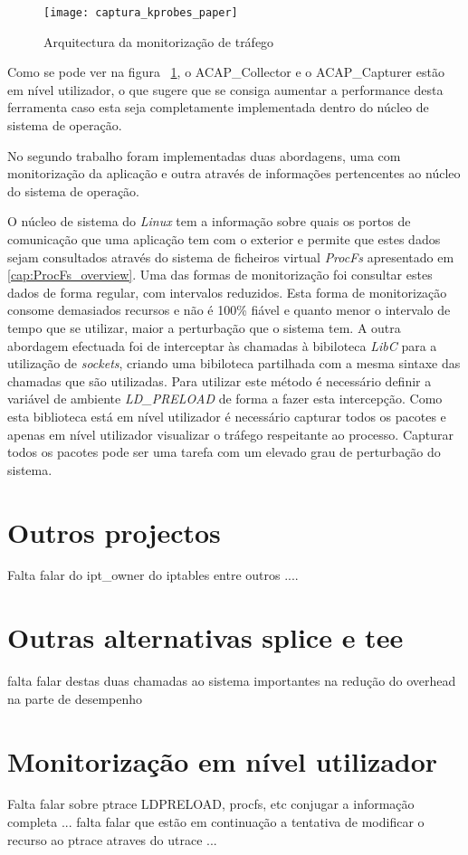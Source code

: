\begin{figure}[h!]
       \centering
       \texttt{[image: captura\_kprobes\_paper]}
       \caption{Arquitectura da monitorização de tráfego}
	\label{fig:paper_capture_kprobes}
\end{figure}


Como se pode ver na figura ~\ref{fig:paper_capture_kprobes}, o ACAP\_Collector e o ACAP\_Capturer estão em nível utilizador, o que sugere que se consiga aumentar a performance desta ferramenta caso esta seja completamente implementada dentro do núcleo de sistema de operação.

No segundo trabalho foram implementadas duas abordagens, uma com monitorização da aplicação e outra através de informações pertencentes ao núcleo do sistema de operação.

O núcleo de sistema do \textit{Linux} tem a informação sobre quais os portos de comunicação que uma aplicação tem com o exterior e permite que estes dados sejam consultados através do sistema de ficheiros virtual \textit{ProcFs} apresentado em \ref{cap:ProcFs_overview}. Uma das formas de monitorização foi consultar estes dados de forma regular, com intervalos reduzidos. Esta forma de monitorização consome demasiados recursos e não é 100\% fiável e quanto menor o intervalo de tempo que se utilizar, maior a perturbação que o sistema tem.
A outra abordagem efectuada foi de interceptar às chamadas à bibiloteca \textit{LibC} para a utilização de \textit{sockets}, criando uma bibiloteca partilhada com a mesma sintaxe das chamadas que são utilizadas. Para utilizar este método é necessário definir a variável de ambiente \textit{LD\_PRELOAD} de forma a fazer esta intercepção. Como esta biblioteca está em nível utilizador é necessário capturar todos os pacotes e apenas em nível utilizador visualizar o tráfego respeitante ao processo. Capturar todos os pacotes pode ser uma tarefa com um elevado grau de perturbação do sistema. 

\section{Outros projectos}

Falta falar do ipt\_owner do iptables entre outros ....


\section{Outras alternativas splice e tee}

falta falar destas duas chamadas ao sistema importantes na redução do overhead na parte de desempenho

\section{Monitorização em nível utilizador}

Falta falar sobre ptrace LDPRELOAD, procfs, etc conjugar a informação completa ... falta falar que estão em continuação a tentativa de modificar o recurso ao ptrace atraves do utrace ... 
